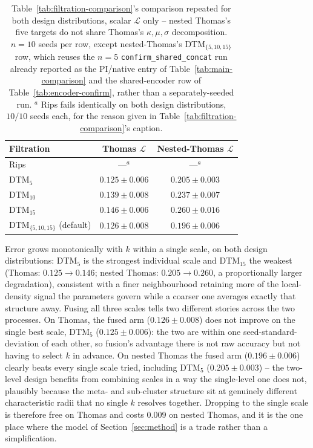 \documentclass[11pt,letterpaper]{article}
\newcommand{\1}{\mathds{1}}
\theoremstyle{plain}
\theoremstyle{definitioncolon}
\begin{document}
\begin{table}[tbp]
\centering
\small
\begin{tabular}{lcc}
\toprule
Filtration & Thomas $\mathcal{L}$ & Nested-Thomas $\mathcal{L}$ \\
\midrule
Rips                          & ---$^a$           & ---$^a$ \\
DTM$_5$                       & $0.125 \pm 0.006$ & $0.205 \pm 0.003$ \\
DTM$_{10}$                    & $0.139 \pm 0.008$ & $0.237 \pm 0.007$ \\
DTM$_{15}$                    & $0.146 \pm 0.006$ & $0.260 \pm 0.016$ \\
DTM$_{\{5,10,15\}}$ (default) & $0.126 \pm 0.008$ & $0.196 \pm 0.006$ \\
\bottomrule
\end{tabular}
\caption{Table~\ref{tab:filtration-comparison}'s comparison repeated for both
design distributions, scalar $\mathcal{L}$ only -- nested Thomas's five
targets do not share Thomas's $\kappa,\mu,\sigma$ decomposition. $n=10$ seeds
per row, except nested-Thomas's DTM$_{\{5,10,15\}}$ row, which reuses the
$n=5$ \texttt{confirm\_shared\_concat} run already reported as the PI/native
entry of Table~\ref{tab:main-comparison} and the shared-encoder row of
Table~\ref{tab:encoder-confirm}, rather than a separately-seeded run.
$^a$ Rips fails identically on both design distributions, $10/10$ seeds each,
for the reason given in Table~\ref{tab:filtration-comparison}'s caption.}
\label{tab:filtration-comparison-nt}
\end{table}

Error grows monotonically with $k$ within a single scale, on both design
distributions: DTM$_5$ is the strongest individual scale and DTM$_{15}$ the
weakest (Thomas: $0.125\to0.146$; nested Thomas: $0.205\to0.260$, a
proportionally larger degradation), consistent with a finer neighbourhood
retaining more of the local-density signal the parameters govern while a
coarser one averages exactly that structure away. Fusing all three scales
tells two different stories across the two processes. On Thomas, the fused
arm ($0.126\pm0.008$) does not improve on the single best scale, DTM$_5$
($0.125\pm0.006$): the two are within one seed-standard-deviation of each
other, so fusion's advantage there is not raw accuracy but not having to
select $k$ in advance. On
nested Thomas the fused arm ($0.196\pm0.006$) clearly beats every single
scale tried, including DTM$_5$ ($0.205\pm0.003$) -- the two-level design
benefits from combining scales in a way the single-level one does not,
plausibly because the meta- and sub-cluster structure sit at genuinely
different characteristic radii that no single $k$ resolves together. Dropping
to the single scale is therefore free on Thomas and costs $0.009$ on nested
Thomas, and it is the one place where the model of Section~\ref{sec:method} is
a trade rather than a simplification.
\end{document}
